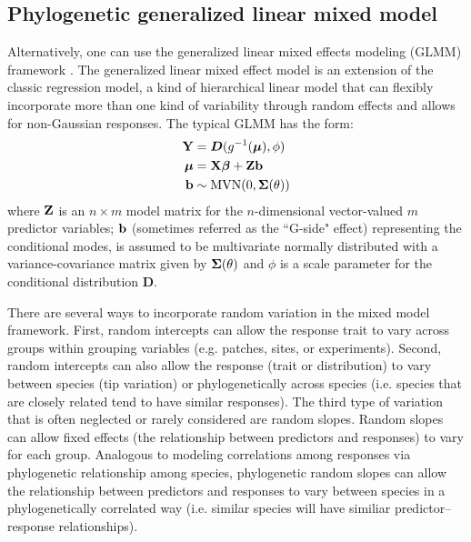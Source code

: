 \documentclass[12pt]{article}
\begin{document}
\subsection*{Phylogenetic generalized linear mixed model}
Alternatively, one can use the generalized linear mixed effects modeling (GLMM) framework \citep{lynch1991methods}.
The generalized linear mixed effect model is an extension of the classic regression model, a kind of hierarchical linear model that can flexibly incorporate more than one kind of variability through random effects and allows for non-Gaussian responses.
The typical GLMM has the form:
\begin{equation}
\begin{aligned}
{\mathbf Y} & = \bm{D}(g^{-1}({\boldsymbol \mu}), \phi) \\
{\boldsymbol \mu} & = {\mathbf X} {\boldsymbol \beta} + {\mathbf Z} {\mathbf b}  \\
{\mathbf b} & \sim \textrm{MVN}(0, {\boldsymbol \Sigma}(\theta))  \\
\label{eq:glmm}
\end{aligned}
\end{equation}
where ${\mathbf Z}$ is an $n \times m$ model matrix for the $n$-dimensional vector-valued $m$ predictor variables; ${\mathbf b}$ (sometimes referred as the ``G-side" effect) representing the conditional modes, is assumed to be multivariate normally distributed with a variance-covariance matrix given by ${\boldsymbol \Sigma}(\theta)$ and $\phi$ is a scale parameter for the conditional distribution $\bm{D}$.

There are several ways to incorporate random variation in the mixed model framework.
First, random intercepts can allow the response trait to vary across groups within grouping variables (e.g. patches, sites, or experiments). 
Second, random intercepts can also allow the response (trait or distribution) to vary between species (tip variation) or phylogenetically across species (i.e. species that are closely related tend to have similar responses).
The third type of variation that is often neglected or rarely considered are random slopes.
Random slopes can allow fixed effects (the relationship between predictors and responses) to vary for each group. 
Analogous to modeling correlations among responses via phylogenetic relationship among species, phylogenetic random slopes can allow the relationship between predictors and responses to vary between species in a phylogenetically correlated way (i.e. similar species will have similiar predictor--response relationships).
\end{document}

